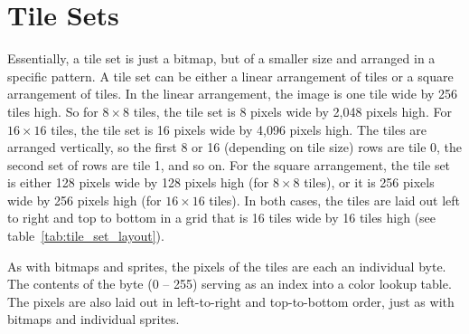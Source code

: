 \section*{Tile Sets}

Essentially, a tile set is just a bitmap, but of a smaller size and arranged in a specific pattern. A tile set can be either a linear arrangement of tiles or a square arrangement of tiles. In the linear arrangement, the image is one tile wide by 256 tiles high. So for $8 \times 8$ tiles, the tile set is 8 pixels wide by 2,048 pixels high. For $16 \times 16$ tiles, the tile set is 16 pixels wide by 4,096 pixels high. The tiles are arranged vertically, so the first 8 or 16 (depending on tile size) rows are tile 0, the second set of rows are tile 1, and so on. For the square arrangement, the tile set is either 128 pixels wide by 128 pixels high (for $8 \times 8$ tiles), or it is 256 pixels wide by 256 pixels high (for $16 \times 16$ tiles). In both cases, the tiles are laid out left to right and top to bottom in a grid that is 16 tiles wide by 16 tiles high (see table~\ref{tab:tile_set_layout}).

As with bitmaps and sprites, the pixels of the tiles are each an individual byte. The contents of the byte (0 -- 255) serving as an index into a color lookup table. The pixels are also laid out in left-to-right and top-to-bottom order, just as with bitmaps and individual sprites.

